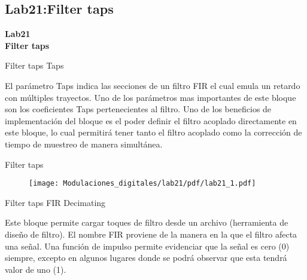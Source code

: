 \subsection{Lab21:Filter taps}

\begin{frame}{}


\bfseries{\textrm{\LARGE Lab21\\ \Large Filter taps}}
\raggedright
\end{frame}

\begin{frame}{Filter taps}
Taps
\begin{flushleft}
El parámetro Taps indica las secciones de un filtro FIR el cual emula un retardo con múltiples trayectos. Uno de los parámetros mas importantes de este bloque son los coeficientes Taps pertenecientes al filtro. Uno de los beneficios de implementación del bloque es el poder definir el filtro acoplado directamente en este bloque, lo cual permitirá tener tanto el filtro acoplado como la corrección de tiempo de muestreo de manera simultánea. 
\end{flushleft}
\end{frame}


\begin{frame}{Filter taps}
\begin{figure}[H]
\centering
\texttt{[image: Modulaciones\_digitales/lab21/pdf/lab21\_1.pdf]}
\end{figure}
\end{frame}

\begin{frame}{Filter taps}
FIR Decimating
\begin{flushleft}
Este bloque permite cargar toques de filtro desde un archivo (herramienta de diseño de filtro). El nombre FIR proviene de la manera en la que el filtro afecta una señal.
Una función de impulso permite evidenciar que la señal es cero (0) siempre, excepto en algunos lugares donde se podrá observar que esta tendrá valor de uno (1). 
\end{flushleft}
\end{frame}


